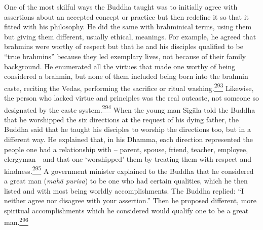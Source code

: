 One of the most skilful ways the Buddha taught was to initially agree
with assertions about an accepted concept or practice but then redefine
it so that it fitted with his philosophy. He did the same with
brahminical terms, using them but giving them different, usually
ethical, meanings. For example, he agreed that brahmins were worthy of
respect but that he and his disciples qualified to be ``true brahmins''
because they led exemplary lives, not because of their family
background. He enumerated all the virtues that made one worthy of being
considered a brahmin, but none of them included being born into the
brahmin caste, reciting the Vedas, performing the sacrifice or ritual
washing.\label{footprints_split_010.html_fnref293}\hyperref[footprints_split_024.htmlux5cux23fn293]{\textsuperscript{293}}
Likewise, the person who lacked virtue and principles was the real
outcaste, not someone so designated by the caste
system.\label{footprints_split_010.html_fnref294}\hyperref[footprints_split_024.htmlux5cux23fn294]{\textsuperscript{294}}
When the young man Sigāla told the Buddha that he worshipped the six
directions at the request of his dying father, the Buddha said that he
taught his disciples to worship the directions too, but in a different
way. He explained that, in his Dhamma, each direction represented the
people one had a relationship with -- parent, spouse, friend, teacher,
employee, clergyman---and that one `worshipped' them by treating them
with respect and
kindness.\label{footprints_split_010.html_fnref295}\hyperref[footprints_split_024.htmlux5cux23fn295]{\textsuperscript{295}}
A government minister explained to the Buddha that he considered a great
man (\emph{mahā purisa}) to be one who had certain qualities, which he
then listed and with most being worldly accomplishments. The Buddha
replied: ``I neither agree nor disagree with your assertion.'' Then he
proposed different, more spiritual accomplishments which he considered
would qualify one to be a great
man.\label{footprints_split_010.html_fnref296}\hyperref[footprints_split_024.htmlux5cux23fn296]{\textsuperscript{296}}

